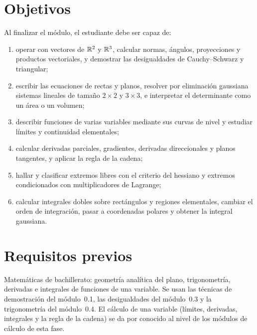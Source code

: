 \documentclass[11pt,a4paper,twoside,openany]{book}
\begin{document}
\section*{Objetivos}
Al finalizar el módulo, el estudiante debe ser capaz de:
\begin{enumerate}[label=\arabic*.]
  \item operar con vectores de $\mathbb{R}^2$ y $\mathbb{R}^3$, calcular normas, ángulos, proyecciones y productos vectoriales, y demostrar las desigualdades de Cauchy--Schwarz y triangular;
  \item escribir las ecuaciones de rectas y planos, resolver por eliminación gaussiana sistemas lineales de tamaño $2\times2$ y $3\times3$, e interpretar el determinante como un área o un volumen;
  \item describir funciones de varias variables mediante sus curvas de nivel y estudiar límites y continuidad elementales;
  \item calcular derivadas parciales, gradientes, derivadas direccionales y planos tangentes, y aplicar la regla de la cadena;
  \item hallar y clasificar extremos libres con el criterio del hessiano y extremos condicionados con multiplicadores de Lagrange;
  \item calcular integrales dobles sobre rectángulos y regiones elementales, cambiar el orden de integración, pasar a coordenadas polares y obtener la integral gaussiana.
\end{enumerate}

\section*{Requisitos previos}
Matemáticas de bachillerato: geometría analítica del plano, trigonometría, derivadas e integrales de funciones de una variable. Se usan las técnicas de demostración del módulo~0.1, las desigualdades del módulo~0.3 y la trigonometría del módulo~0.4. El cálculo de una variable (límites, derivadas, integrales y la regla de la cadena) se da por conocido al nivel de los módulos de cálculo de esta fase.
\end{document}
